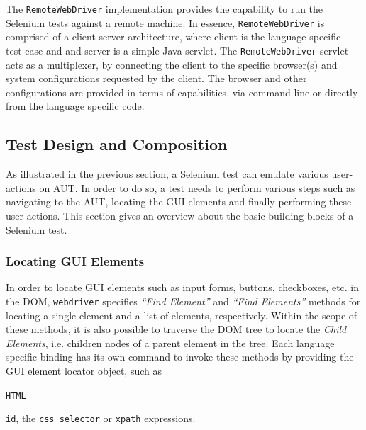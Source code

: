 The \texttt{RemoteWebDriver} implementation provides the capability to run the Selenium tests against a remote machine. In essence, \texttt{RemoteWebDriver} is comprised of a client-server architecture, where client is the language specific test-case and and server is a simple Java servlet. The \texttt{RemoteWebDriver} servlet acts as a multiplexer, by connecting the client to the specific browser(s) and system configurations requested by the client. The browser and other configurations are provided in terms of capabilities, via command-line or directly from the language specific code.
\subsection{Test Design and Composition}
\label{testDesignPractices}
As illustrated in the previous section, a Selenium test can emulate various user-actions on AUT. In order to do so, a test needs to perform various steps such as navigating to the AUT, locating the GUI elements and finally performing these user-actions. This section gives an overview about the basic building blocks of a Selenium test. 
\subsubsection{Locating GUI Elements}
\label{sssec:locatingUIElements}
In order to locate GUI elements such as input forms, buttons, checkboxes, etc. in the DOM, \texttt{webdriver} specifies \textit{``Find Element''} and \textit{``Find Elements''} methods for locating a single element and a list of elements, respectively. 
Within the scope of these methods, it is also possible to traverse the DOM tree to locate the \textit{Child Elements}, i.e. children nodes of a parent element in the tree. 
Each language specific binding has its own command to invoke these methods by providing the GUI element locator object, such as\begin{small} \texttt{HTML}\end{small} \texttt{id}, the \texttt{css selector} or \texttt{xpath} expressions.


